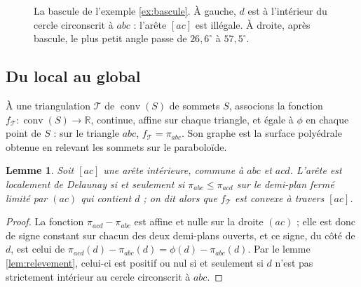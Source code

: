 \documentclass[11pt,a4paper]{article}
\theoremstyle{plain}
\newtheorem{lemme}[theoreme]{Lemme}
\theoremstyle{definition}
\theoremstyle{remark}
\newcommand{\R}{\mathbb{R}}
\DeclareMathOperator{\conv}{conv}
\begin{document}
\begin{figure}[h]
\centering
{}
\caption{La bascule de l'exemple \ref{ex:bascule}. À gauche, $d$ est à l'intérieur du cercle circonscrit à $abc$ : l'arête $[ac]$ est illégale. À droite, après bascule, le plus petit angle passe de $26{,}6^\circ$ à $57{,}5^\circ$.}\label{fig:bascule}
\end{figure}

\subsection{Du local au global}

À une triangulation $\mathcal T$ de $\conv(S)$ de sommets $S$, associons la fonction $f_{\mathcal T}:\conv(S)\to\R$, continue, affine sur chaque triangle, et égale à $\phi$ en chaque point de $S$ : sur le triangle $abc$, $f_{\mathcal T}=\pi_{abc}$. Son graphe est la surface polyédrale obtenue en relevant les sommets sur le paraboloïde.

\begin{lemme}\label{lem:pli}
Soit $[ac]$ une arête intérieure, commune à $abc$ et $acd$. L'arête est localement de Delaunay si et seulement si $\pi_{abc}\leq\pi_{acd}$ sur le demi-plan fermé limité par $(ac)$ qui contient $d$ ; on dit alors que $f_{\mathcal T}$ est \emph{convexe à travers} $[ac]$.
\end{lemme}

\begin{proof}
La fonction $\pi_{acd}-\pi_{abc}$ est affine et nulle sur la droite $(ac)$ ; elle est donc de signe constant sur chacun des deux demi-plans ouverts, et ce signe, du côté de $d$, est celui de $\pi_{acd}(d)-\pi_{abc}(d)=\phi(d)-\pi_{abc}(d)$. Par le lemme \ref{lem:relevement}, celui-ci est positif ou nul si et seulement si $d$ n'est pas strictement intérieur au cercle circonscrit à $abc$.
\end{proof}
\end{document}
